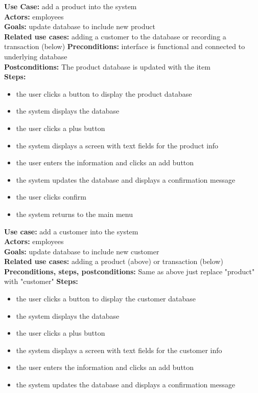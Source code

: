\documentclass[notitlepage, 11pt]{report}
\begin{document}
\begin{enumerate}[itemindent=-1.5em]
	\textbf{Use Case:} add a product into the system\\
	\textbf{Actors:} employees\\
	\textbf{Goals:} update database to include new product\\
	\textbf{Related use cases:} adding a customer to the database or recording a transaction (below)
	\textbf{Preconditions:} interface is functional and connected to underlying database\\
	\textbf{Postconditions:} The product database is updated with the item\\
	\textbf{Steps:}
		\begin{itemize}
		\item the user clicks a button to display the product database
		\item the system displays the database
		\item the user clicks a plus button 
		\item the system displays a screen with text fields for the product info
		\item the user enters the information and clicks an add button
		\item the system updates the database and displays a confirmation message
		\item the user clicks confirm 
		\item the system returns to the main menu
		\end{itemize}
	\textbf{Use case:} add a customer into the system\\
	\textbf{Actors:} employees\\
	\textbf{Goals:} update database to include new customer\\
	\textbf{Related use cases:} adding a product (above) or transaction (below)
	\textbf{Preconditions, steps, postconditions:} Same as above just replace "product" with "customer"
		\textbf{Steps:}
		\begin{itemize}
		\item the user clicks a button to display the customer database
		\item the system displays the database
		\item the user clicks a plus button 
		\item the system displays a screen with text fields for the customer info
		\item the user enters the information and clicks an add button
		\item the system updates the database and displays a confirmation message

\end{itemize}
\end{enumerate}
\end{document}
